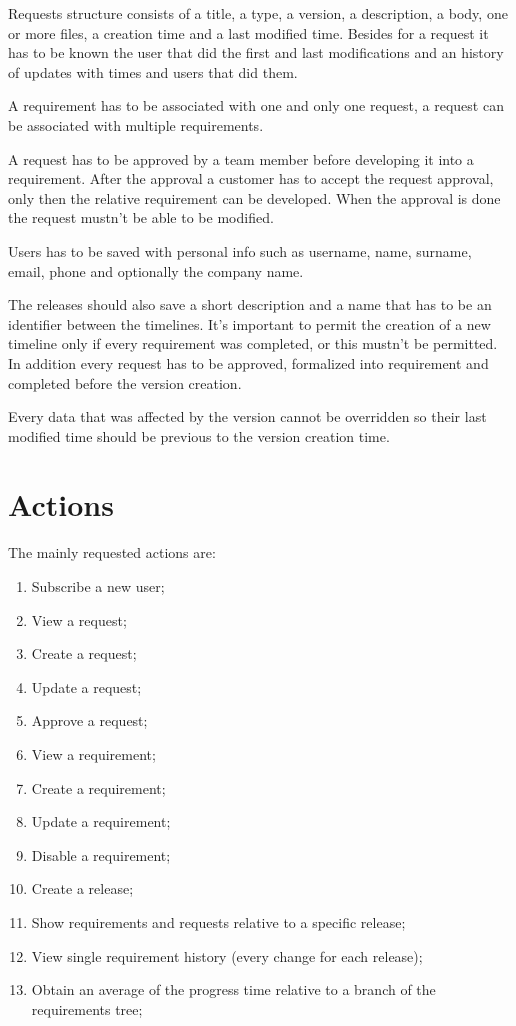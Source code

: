 \documentclass[12pt, a4paper]{report}
\begin{document}
Requests structure consists of a title, a type, a version, a description, a body, one or more files, a creation time and a last
modified time. Besides for a request it has to be known the user that did the first and last modifications and an history of
updates with times and users that did them.

A requirement has to be associated with one and only one request, a request can be associated with multiple requirements.

A request has to be approved by a team member before developing it into a requirement. After the approval a customer has to
accept the request approval, only then the relative requirement can be developed. When the approval is done the request mustn't
be able to be modified.

Users has to be saved with personal info such as username, name, surname, email, phone and optionally the company name.

The releases should also save a short description and a name that has to be an identifier between the timelines. It's important to
permit the creation of a new timeline only if every requirement was completed, or this mustn't be permitted. In addition every
request has to be approved, formalized into requirement and completed before the version creation.

Every data that was affected by the version cannot be overridden so their last modified time should be previous to the version
creation time.


\section*{Actions}

The mainly requested actions are:
\begin{enumerate}
    \item Subscribe a new user;
    \item View a request;
    \item Create a request;
    \item Update a request;
    \item Approve a request;
    \item View a requirement;
    \item Create a requirement;
    \item Update a requirement;
    \item Disable a requirement;
    \item Create a release;
    \item Show requirements and requests relative to a specific release;
    \item View single requirement history (every change for each release);
    \item Obtain an average of the progress time relative to a branch of the requirements tree;
\end{enumerate}
\end{document}
